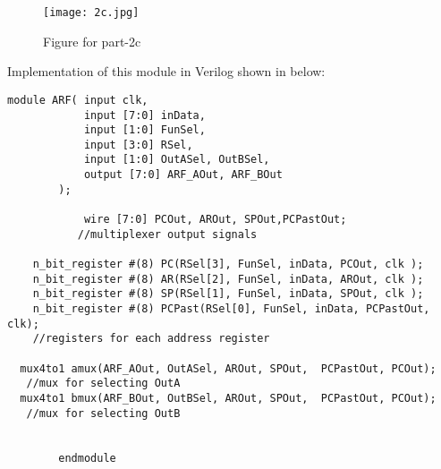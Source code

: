 \documentclass[12pt]{article}
\begin{document}
\begin{figure}[H]
    \centering
    \texttt{[image: 2c.jpg]}
    \caption{Figure for part-2c}
    \label{fig:part2c}
\end{figure}

\clearpage

Implementation of this module in Verilog shown in below:

\vspace{0.4cm}
\begin{lstlisting}
module ARF( input clk,
            input [7:0] inData, 
            input [1:0] FunSel, 
            input [3:0] RSel, 
            input [1:0] OutASel, OutBSel,
            output [7:0] ARF_AOut, ARF_BOut
        );
          
            wire [7:0] PCOut, AROut, SPOut,PCPastOut; 
           //multiplexer output signals
        
    n_bit_register #(8) PC(RSel[3], FunSel, inData, PCOut, clk ); 
    n_bit_register #(8) AR(RSel[2], FunSel, inData, AROut, clk );
    n_bit_register #(8) SP(RSel[1], FunSel, inData, SPOut, clk ); 
    n_bit_register #(8) PCPast(RSel[0], FunSel, inData, PCPastOut, clk);
    //registers for each address register
    
  mux4to1 amux(ARF_AOut, OutASel, AROut, SPOut,  PCPastOut, PCOut);
   //mux for selecting OutA
  mux4to1 bmux(ARF_BOut, OutBSel, AROut, SPOut,  PCPastOut, PCOut);
   //mux for selecting OutB

   
        endmodule
    
\end{lstlisting}

\clearpage
\end{document}
